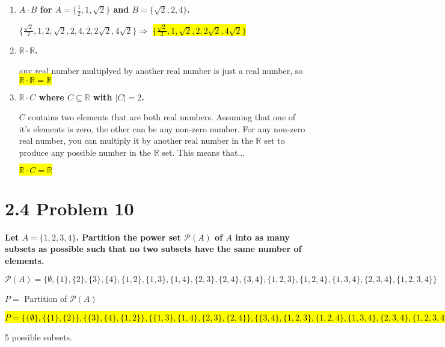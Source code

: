 \documentclass[10pt]{article}
\begin{document}
\begin{enumerate}[label=(\alph*)]

    \item \textbf{$A \cdot B$ for $A = \{\frac{1}{2}, 1, \sqrt{2}\}$ and $B = \{\sqrt{2},2,4\}$.}

        $\{\frac{\sqrt{2}}{2},1,2,\sqrt{2},2,4,2,2\sqrt{2},4\sqrt{2}\} \Rightarrow$
        \hl{$\{\frac{\sqrt{2}}{2}, 1, \sqrt{2}, 2, 2\sqrt{2}, 4\sqrt{2}\}$}

    \item \textbf{$\mathbb{R} \cdot \mathbb{R}$.}

        any real number multiplyed by another real number is just a real number, so
        \hl{$\mathbb{R} \cdot \mathbb{R} = \mathbb{R}$}

    \item \textbf{$\mathbb{R} \cdot C$ where $C \subseteq \mathbb{R}$ with $|C| = 2$.}

        $C$ contains two elements that are both real numbers. Assuming that one of it's
        elements is zero, the other can be any non-zero number. For any non-zero real
        number, you can multiply it by another real number in the $\mathbb{R}$ set to 
        produce any possible number in the $\mathbb{R}$ set. This means that...

        \hl{$\mathbb{R} \cdot C = \mathbb{R}$}

\end{enumerate}



\section{2.4 Problem 10}
\textbf{Let $A = \{1,2,3,4\}$. Partition the power set $\mathcal{P}(A)$ of $A$ into
as many subsets as possible such that no two subsets have the same number of elements.}

$\mathcal{P}(A) = \big\{\emptyset, \{1\}, \{2\}, \{3\}, \{4\}, \{1,2\}, \{1,3\}, \{1,4\}, 
\{2,3\}, \{2,4\}, \{3,4\}, \{1,2,3\}, \{1,2,4\}, \{1,3,4\}, \{2,3,4\}, \{1,2,3,4\}\big\}$

\par \vspace{\baselineskip}

$P =$ Partition of $\mathcal{P}(A)$

{\small
    \hl{
        $ P = 
        \Big\{\big\{\emptyset\big\}, 
        \big\{\{1\},\{2\}\big\}, 
        \big\{\{3\},\{4\},\{1,2\}\big\}, 
        \big\{\{1,3\},\{1,4\},\{2,3\},\{2,4\}\big\}, 
        \big\{\{3,4\},\{1,2,3\},\{1,2,4\},\{1,3,4\},
        \{2,3,4\},\{1,2,3,4\}\big\}\Big\} $
    }
}%

5 possible subsets.
\end{document}
